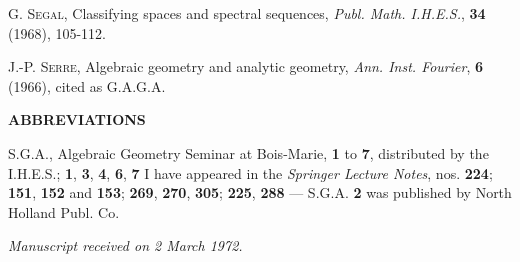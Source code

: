 \documentclass[11pt,leqno]{article}
\begin{document}
{\noindent [14] G. \textsc{Segal}, Classifying spaces and spectral sequences, \textit{Publ. Math. I.H.E.S.}, \textbf{34} (1968), 105-112.

\noindent [15] J.-P. \textsc{Serre}, Algebraic geometry and analytic geometry, \textit{Ann. Inst. Fourier}, \textbf{6} (1966), cited as G.A.G.A.

\begin{center}
\textbf{ABBREVIATIONS}
\end{center}

\noindent S.G.A., Algebraic Geometry Seminar at Bois-Marie, \textbf{1} to \textbf{7}, distributed by the I.H.E.S.; \textbf{1}, \textbf{3}, \textbf{4}, \textbf{6}, \textbf{7} I have appeared in the \textit{Springer Lecture Notes}, nos. \textbf{224}; \textbf{151}, \textbf{152} and \textbf{153}; \textbf{269}, \textbf{270}, \textbf{305}; \textbf{225}, \textbf{288} — S.G.A. \textbf{2} was published by North Holland Publ. Co.
\par
}

\begin{flushright}
\textit{Manuscript received on 2 March 1972.}
\end{flushright}
\end{document}
